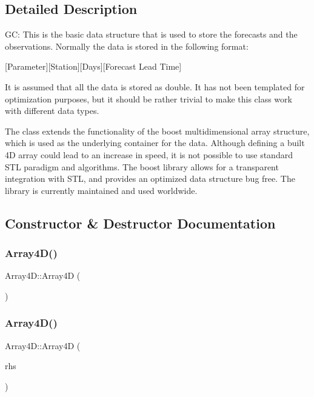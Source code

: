 \subsection{Detailed Description}
GC\+: This is the basic data structure that is used to store the forecasts and the observations. Normally the data is stored in the following format\+:

\mbox{[}Parameter\mbox{]}\mbox{[}Station\mbox{]}\mbox{[}Days\mbox{]}\mbox{[}Forecast Lead Time\mbox{]}

It is assumed that all the data is stored as double. It has not been templated for optimization purposes, but it should be rather trivial to make this class work with different data types.

The class extends the functionality of the boost multidimensional array structure, which is used as the underlying container for the data. Although defining a built 4D array could lead to an increase in speed, it is not possible to use standard S\+TL paradigm and algorithms. The boost library allows for a transparent integration with S\+TL, and provides an optimized data structure bug free. The library is currently maintained and used worldwide. 

\subsection{Constructor \& Destructor Documentation}
\mbox{\label{class_array4_d_a1bc84c0dcc22ed0e218040b01f56b816}} 
\subsubsection{\texorpdfstring{Array4\+D()}{Array4D()}\hspace{0.1cm}{\footnotesize\ttfamily [1/5]}}
{\footnotesize\ttfamily Array4\+D\+::\+Array4D (\begin{DoxyParamCaption}{ }\end{DoxyParamCaption})}

\mbox{\label{class_array4_d_a7395b077e949df98c4cfe0c0aa93f2a8}} 
\subsubsection{\texorpdfstring{Array4\+D()}{Array4D()}\hspace{0.1cm}{\footnotesize\ttfamily [2/5]}}
{\footnotesize\ttfamily Array4\+D\+::\+Array4D (\begin{DoxyParamCaption}\item[{const \mbox{\hyperlink{class_array4_d}{Array4D}} \&}]{rhs }\end{DoxyParamCaption})}

